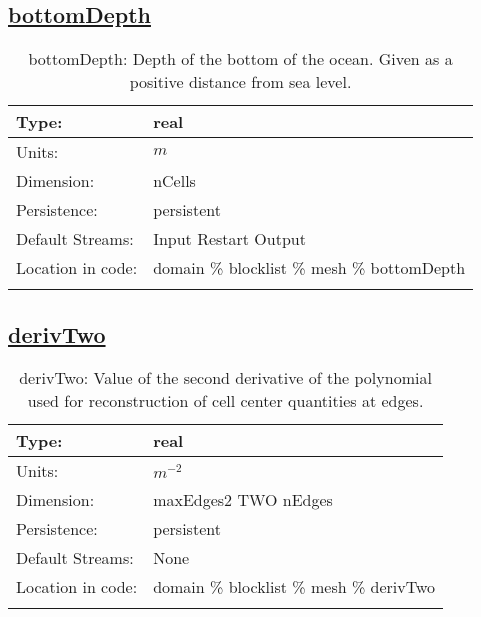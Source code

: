 \subsection[bottomDepth]{\hyperref[sec:var_tab_mesh]{bottomDepth}}
\label{subsec:var_sec_mesh_bottomDepth}
\begin{center}
\begin{longtable}{| p{2.0in} | p{4.0in} |}
        \hline 
        Type: & real \\
        \hline 
        Units: & $m$ \\
        \hline 
        Dimension: & nCells \\
        \hline 
        Persistence: & persistent \\
        \hline 
		 Default Streams: & Input Restart Output  \\
        \hline 
		 Location in code: & domain \% blocklist \% mesh \% bottomDepth \\
		 \hline 
    \caption{bottomDepth: Depth of the bottom of the ocean. Given as a positive distance from sea level.}
\end{longtable}
\end{center}
\subsection[derivTwo]{\hyperref[sec:var_tab_mesh]{derivTwo}}
\label{subsec:var_sec_mesh_derivTwo}
\begin{center}
\begin{longtable}{| p{2.0in} | p{4.0in} |}
        \hline 
        Type: & real \\
        \hline 
        Units: & $m^{-2}$ \\
        \hline 
        Dimension: & maxEdges2 TWO nEdges \\
        \hline 
        Persistence: & persistent \\
        \hline 
		 Default Streams: & None \\
        \hline 
		 Location in code: & domain \% blocklist \% mesh \% derivTwo \\
		 \hline 
    \caption{derivTwo: Value of the second derivative of the polynomial used for reconstruction of cell center quantities at edges.}
\end{longtable}
\end{center}
